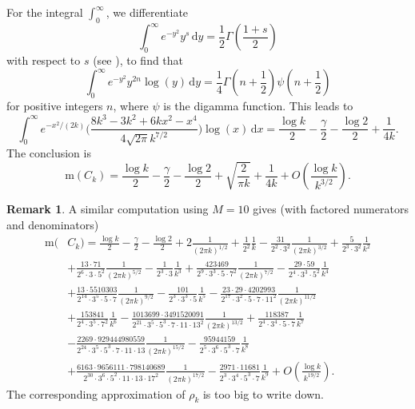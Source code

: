\documentclass[12pt,reqno]{amsart}
\theoremstyle{definition}
\theoremstyle{plain}
\theoremstyle{definition}
\newtheorem{remark}[theorem]{Remark}
\newcommand\m{\mathrm{m}}
\renewcommand{\d}{\mathrm{d}}
\begin{document}
For the integral $\int_0^\infty$, we differentiate 
\[
\int_0^\infty e^{-y^2} y^{s} \, \d y = \frac{1}{2}\Gamma \left(\frac{1+s}{2}\right)
\]
with respect to $s$ (see \cite[p. 337]{GR}), to find that 
\[
\int_0^\infty e^{-y^2} y^{2n} \log(y) \, \d y=  \frac{1}{4} \Gamma \left(n+\frac{1}{2}\right) \psi \left(n+\frac{1}{2}\right)
\]
for positive integers $n$, where $\psi$ is the digamma function. This leads to 
\[
\int_0^\infty e^{-x^2/(2k)} \Bigg (\frac{8 k^3-3 k^2+6 k x^2-x^4}{4 \sqrt{2 \pi } k^{7/2}}\Bigg) \log(x) \, \d x = \frac{\log k}{2} - \frac{\gamma}{2} - \frac{\log 2 }{2} + \frac{1}{4 k}.
\]
The conclusion is 
\[
\m(C_k) = \frac{\log k }{2} - \frac{\gamma}{2} - \frac{\log 2 }{2} + \sqrt{\frac{2}{\pi k }} + \frac{1}{4 k} + O\left(\frac{\log k }{k^{3/2}} \right).
\]

\begin{remark} 
A similar computation using $M = 10$ gives (with factored numerators and denominators)
\begin{align}
	\m(&C_k) =\frac{\log k}{2} - \frac{\gamma}{2} - \frac{\log 2 }{2} + 2 \frac{1}{(2\pi k)^{1/2}} + \frac{1}{2^2} \frac{1}{k}  -\frac{31}{2^2\cdot 3^2} \frac{1}{(2 \pi k)^{3/2}}+\frac{5}{2^3\cdot 3^2} \frac{1}{k^2}
	\nonumber \\&+\frac{13\cdot 71 }{2^6\cdot 3\cdot 5^2}\frac{1}{(2 \pi k)^{5/2}}-\frac{1}{2^3\cdot 3}\frac{1}{k^3} +\frac{423469}{2^9\cdot 3^3\cdot 5\cdot 7^2 } \frac{1}{(2 \pi k)^{7/2}}-\frac{29\cdot 59}{2^4\cdot 3^3\cdot 5^2}  \frac{1}{k^4}
	\nonumber \\&+\frac{13\cdot 5510303}{2^{14}\cdot 3^5\cdot 5\cdot 7} \frac{1}{(2 \pi k)^{9/2}}-\frac{101}{2^3\cdot 3^3\cdot 5}\frac{1}{k^5}-\frac{23\cdot 29\cdot 4202993}{2^{17}\cdot 3^2\cdot 5\cdot 7\cdot 11^2} \frac{1}{(2 \pi k)^{11/2}} 
	\nonumber \\&+\frac{153841}{2^4\cdot 3^5\cdot 7^2}\frac{1}{k^6}-\frac{1013699\cdot 3491520091}{2^{21}\cdot 3^5\cdot 5^3\cdot 7\cdot 11\cdot 13^2  } \frac{1}{(2 \pi k)^{13/2}}+\frac{118387}{2^4\cdot 3^4\cdot 5\cdot 7}\frac{1}{k^7}
	\nonumber \\&-\frac{2269\cdot 929444980559}{2^{24}\cdot 3^5\cdot 5^3\cdot 7\cdot 11\cdot 13}\frac{1}{(2 \pi k)^{15/2}} -\frac{95944159}{2^5\cdot 3^6\cdot 5^3\cdot 7}\frac{1}{k^8} \nonumber \\ &+\frac{6163\cdot 9656111\cdot 798140689}{ 2^{30} \cdot 3^6 \cdot 5^2 \cdot 11 \cdot 13 \cdot 17^2}\frac{1}{(2 \pi  k)^{17/2}}
	-\frac{2971\cdot 11681}{2^3\cdot 3^4\cdot 5^3\cdot 7}\frac{1}{k^9}+O\left(\frac{\log k}{k^{19/2}}\right). \label{moreterms}
\end{align}
The corresponding approximation of $\rho_k$ is too big to write down.


\end{remark}
\end{document}
